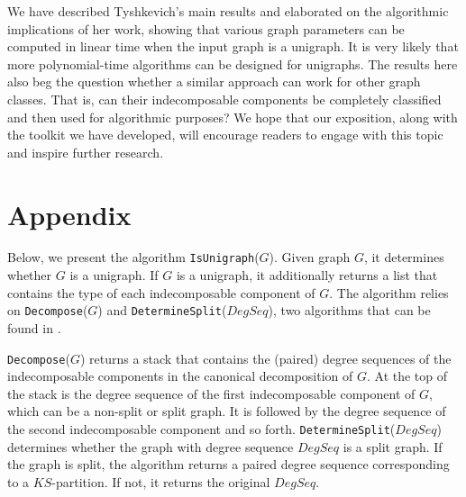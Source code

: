 \documentclass[11pt]{article}
\begin{document}
	
	We have described Tyshkevich's main results and elaborated on  the algorithmic implications of her work,  showing that  various graph parameters can be computed in linear time when the input graph is a unigraph.   It is very likely that  more polynomial-time algorithms can be designed for unigraphs.  The results here also beg the question whether a similar approach can work for other graph classes.  That is, can their indecomposable components be completely classified and then used for algorithmic purposes?  We hope that our exposition, along with the toolkit we have developed, will encourage readers to engage with this topic and inspire further research.  

        
	
	


	
\newpage	
\section*{Appendix}


Below, we present the algorithm {\tt IsUnigraph}($G$).  Given graph $G$, it determines whether $G$ is a unigraph.  If $G$ is a unigraph, it additionally returns a list that contains the type of each indecomposable component of $G$.  
The algorithm relies on {\tt Decompose}($G$) and {\tt DetermineSplit}($\mathit{DegSeq}$), two algorithms that can be found in \cite{Ch25}.  %

{\tt Decompose}($G$) returns a stack that contains the (paired) degree sequences of the indecomposable components in the canonical decomposition of $G$.  At the top of the stack is the degree sequence of the first indecomposable component of $G$, which can be a non-split or split graph.  It is followed by the degree sequence of the second indecomposable component and so forth.  {\tt DetermineSplit}($\mathit{DegSeq}$) determines whether the graph with degree sequence $\mathit{DegSeq}$ is a split graph.  If the graph is split, the algorithm returns a paired degree sequence corresponding to a $KS$-partition.  If not, it returns the original $\mathit{DegSeq}$.  
\end{document}
